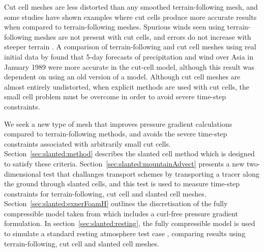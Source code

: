 Cut cell meshes are less distorted than any smoothed terrain-following mesh, and some studies have shown examples where cut cells produce more accurate results when compared to terrain-following meshes.
Spurious winds seen using terrain-following meshes are not present with cut cells, and errors do not increase with steeper terrain \citep{good2014}.
A comparison of terrain-following and cut cell meshes using real initial data by \citet{steppeler2013} found that 5-day forecasts of precipitation and wind over Asia in January 1989 were more accurate in the cut-cell model, although this result was dependent on using an old version of a model.
Although cut cell meshes are almost entirely undistorted, when explicit methods are used with cut cells, the small cell problem must be overcome in order to avoid severe time-step constraints.

We seek a new type of mesh that improves pressure gradient calculations compared to terrain-following methods, and avoids the severe time-step constraints associated with arbitrarily small cut cells.  Section~\ref{sec:slanted:method} describes the slanted cell method which is designed to satisfy these criteria.
Section~\ref{sec:slanted:mountainAdvect} presents a new two-dimensional test that challanges transport schemes by transporting a tracer along the ground through slanted cells, and this test is used to measure time-step constraints for terrain-following, cut cell and slanted cell meshes.
Section~\ref{sec:slanted:exnerFoamH} outlines the discretisation of the fully compressible model taken from \citet{weller-shahrokhi2014} which includes a curl-free pressure gradient formulation.  In section~\ref{sec:slanted:resting}, the fully compressible model is used to simulate a standard resting atmosphere test case \citep{klemp2011}, comparing results using terrain-following, cut cell and slanted cell meshes.





